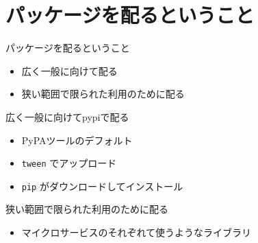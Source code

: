 \documentclass[presentation]{beamer}
\begin{document}
\section{パッケージを配るということ}
\label{sec:org81e3064}
\begin{frame}[label={sec:org28309b9}]{パッケージを配るということ}
\begin{itemize}
\item 広く一般に向けて配る
\item 狭い範囲で限られた利用のために配る
\end{itemize}
\end{frame}
\begin{frame}[label={sec:org2c3fc8f},fragile]{広く一般に向けてpypiで配る}
 \begin{itemize}
\item PyPAツールのデフォルト
\item \texttt{tween} でアップロード
\item \texttt{pip} がダウンロードしてインストール
\end{itemize}
\end{frame}
\begin{frame}[label={sec:org11db628}]{狭い範囲で限られた利用のために配る}
\begin{itemize}
\item マイクロサービスのそれぞれて使うようなライブラリ
\end{itemize}
\end{frame}
\end{document}
